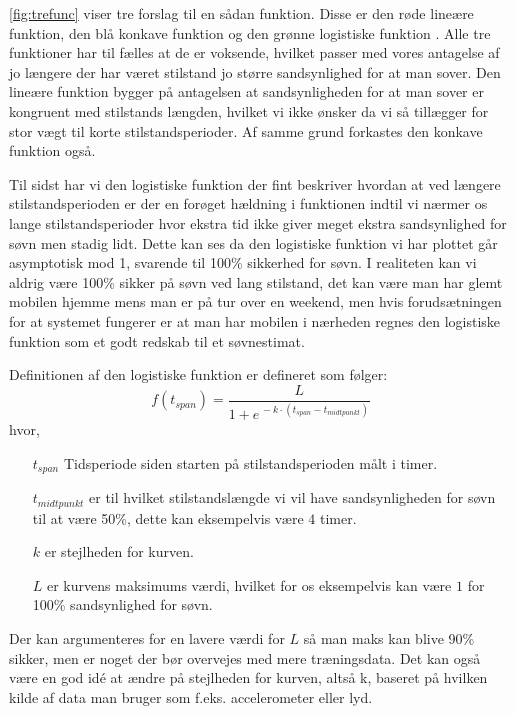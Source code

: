 \cref{fig:trefunc} viser tre forslag til en sådan funktion.
Disse er den røde lineære funktion, den blå konkave funktion og den grønne logistiske funktion \citep{wiki:LogisticFunction}.
Alle tre funktioner har til fælles at de er voksende, hvilket passer med vores antagelse af jo længere der har været stilstand jo større sandsynlighed for at man sover.
Den lineære funktion bygger på antagelsen at sandsynligheden for at man sover er kongruent med stilstands længden, hvilket vi ikke ønsker da vi så tillægger for stor vægt til korte stilstandsperioder.
Af samme grund forkastes den konkave funktion også.

Til sidst har vi den logistiske funktion der fint beskriver hvordan at ved længere stilstandsperioden er der en forøget hældning i funktionen indtil vi nærmer os lange stilstandsperioder hvor ekstra tid ikke giver meget ekstra sandsynlighed for søvn men stadig lidt. 
Dette kan ses da den logistiske funktion vi har plottet går asymptotisk mod 1, svarende til 100\% sikkerhed for søvn.
I realiteten kan vi aldrig være 100\% sikker på søvn ved lang stilstand, det kan være man har glemt mobilen hjemme mens man er på tur over en weekend, men hvis forudsætningen for at systemet fungerer er at man har mobilen i nærheden regnes den logistiske funktion som et godt redskab til et søvnestimat.

Definitionen af den logistiske funktion er defineret som følger:
\begin{equation}
	f(t_{span}) = \frac{L}{1+e^{\,-k\cdot(t_{span} - t_{midtpunkt})}}
\end{equation} 
hvor,
\begin{itemize}
	\item[$t_{span}$] Tidsperiode siden starten på stilstandsperioden målt i timer.
	\item[$t_{midtpunkt}$] er til hvilket stilstandslængde vi vil have sandsynligheden for søvn til at være 50\%, dette kan eksempelvis være $4$ timer.
	\item[$k$] er stejlheden for kurven.
	\item[$L$] er kurvens maksimums værdi, hvilket for os eksempelvis kan være $1$ for 100\% sandsynlighed for søvn.
\end{itemize}

Der kan argumenteres for en lavere værdi for $L$ så man maks kan blive 90\% sikker, men er noget der bør overvejes med mere træningsdata. Det kan også være en god idé at ændre på stejlheden for kurven, altså k, baseret på hvilken kilde af data man bruger som f.eks. accelerometer eller lyd.

